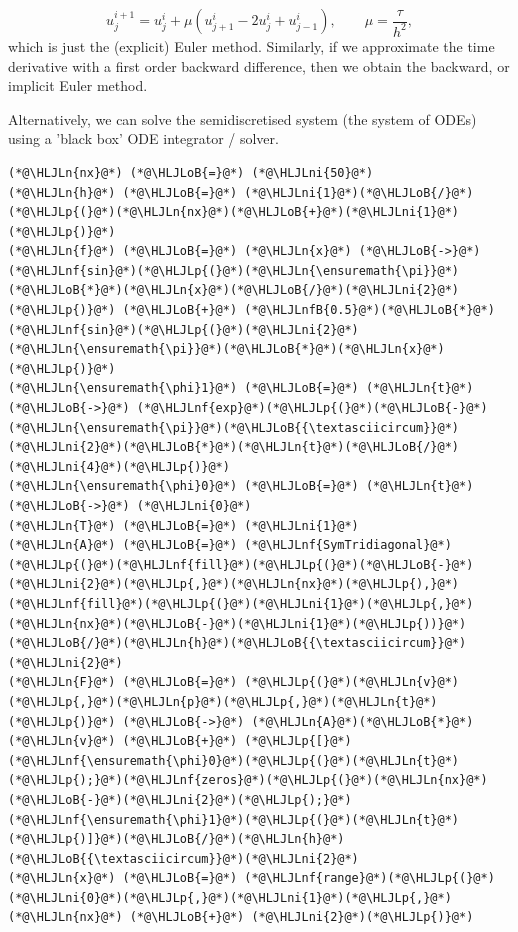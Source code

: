 \documentclass[12pt,a4paper]{article}
\newcommand{\HLJLn}[1]{#1}
\newcommand{\HLJLnf}[1]{\textcolor[RGB]{66,102,213}{#1}}
\newcommand{\HLJLnfB}[1]{\textcolor[RGB]{59,151,46}{#1}}
\newcommand{\HLJLni}[1]{\textcolor[RGB]{59,151,46}{#1}}
\newcommand{\HLJLoB}[1]{\textcolor[RGB]{102,102,102}{\textbf{#1}}}
\newcommand{\HLJLp}[1]{#1}
\begin{document}
\[
u^{i+1}_j = u^i_j + \mu\left(u^i_{j+1} - 2u^i_j + u^i_{j-1}   \right), \qquad \mu = \frac{\tau}{h^2},
\]
which is just the (explicit) Euler method.   Similarly, if we approximate the time derivative with a first order backward difference, then we obtain the backward, or implicit Euler method. 

Alternatively, we can solve the semidiscretised system (the system of ODEs) using a 'black box' ODE integrator / solver.


\begin{lstlisting}
(*@\HLJLn{nx}@*) (*@\HLJLoB{=}@*) (*@\HLJLni{50}@*)
(*@\HLJLn{h}@*) (*@\HLJLoB{=}@*) (*@\HLJLni{1}@*)(*@\HLJLoB{/}@*)(*@\HLJLp{(}@*)(*@\HLJLn{nx}@*)(*@\HLJLoB{+}@*)(*@\HLJLni{1}@*)(*@\HLJLp{)}@*)
(*@\HLJLn{f}@*) (*@\HLJLoB{=}@*) (*@\HLJLn{x}@*) (*@\HLJLoB{->}@*) (*@\HLJLnf{sin}@*)(*@\HLJLp{(}@*)(*@\HLJLn{\ensuremath{\pi}}@*)(*@\HLJLoB{*}@*)(*@\HLJLn{x}@*)(*@\HLJLoB{/}@*)(*@\HLJLni{2}@*)(*@\HLJLp{)}@*) (*@\HLJLoB{+}@*) (*@\HLJLnfB{0.5}@*)(*@\HLJLoB{*}@*)(*@\HLJLnf{sin}@*)(*@\HLJLp{(}@*)(*@\HLJLni{2}@*)(*@\HLJLn{\ensuremath{\pi}}@*)(*@\HLJLoB{*}@*)(*@\HLJLn{x}@*)(*@\HLJLp{)}@*)
(*@\HLJLn{\ensuremath{\phi}1}@*) (*@\HLJLoB{=}@*) (*@\HLJLn{t}@*) (*@\HLJLoB{->}@*) (*@\HLJLnf{exp}@*)(*@\HLJLp{(}@*)(*@\HLJLoB{-}@*)(*@\HLJLn{\ensuremath{\pi}}@*)(*@\HLJLoB{{\textasciicircum}}@*)(*@\HLJLni{2}@*)(*@\HLJLoB{*}@*)(*@\HLJLn{t}@*)(*@\HLJLoB{/}@*)(*@\HLJLni{4}@*)(*@\HLJLp{)}@*)
(*@\HLJLn{\ensuremath{\phi}0}@*) (*@\HLJLoB{=}@*) (*@\HLJLn{t}@*) (*@\HLJLoB{->}@*) (*@\HLJLni{0}@*)
(*@\HLJLn{T}@*) (*@\HLJLoB{=}@*) (*@\HLJLni{1}@*)
(*@\HLJLn{A}@*) (*@\HLJLoB{=}@*) (*@\HLJLnf{SymTridiagonal}@*)(*@\HLJLp{(}@*)(*@\HLJLnf{fill}@*)(*@\HLJLp{(}@*)(*@\HLJLoB{-}@*)(*@\HLJLni{2}@*)(*@\HLJLp{,}@*)(*@\HLJLn{nx}@*)(*@\HLJLp{),}@*)(*@\HLJLnf{fill}@*)(*@\HLJLp{(}@*)(*@\HLJLni{1}@*)(*@\HLJLp{,}@*)(*@\HLJLn{nx}@*)(*@\HLJLoB{-}@*)(*@\HLJLni{1}@*)(*@\HLJLp{))}@*)(*@\HLJLoB{/}@*)(*@\HLJLn{h}@*)(*@\HLJLoB{{\textasciicircum}}@*)(*@\HLJLni{2}@*)
(*@\HLJLn{F}@*) (*@\HLJLoB{=}@*) (*@\HLJLp{(}@*)(*@\HLJLn{v}@*)(*@\HLJLp{,}@*)(*@\HLJLn{p}@*)(*@\HLJLp{,}@*)(*@\HLJLn{t}@*)(*@\HLJLp{)}@*) (*@\HLJLoB{->}@*) (*@\HLJLn{A}@*)(*@\HLJLoB{*}@*)(*@\HLJLn{v}@*) (*@\HLJLoB{+}@*) (*@\HLJLp{[}@*)(*@\HLJLnf{\ensuremath{\phi}0}@*)(*@\HLJLp{(}@*)(*@\HLJLn{t}@*)(*@\HLJLp{);}@*)(*@\HLJLnf{zeros}@*)(*@\HLJLp{(}@*)(*@\HLJLn{nx}@*)(*@\HLJLoB{-}@*)(*@\HLJLni{2}@*)(*@\HLJLp{);}@*)(*@\HLJLnf{\ensuremath{\phi}1}@*)(*@\HLJLp{(}@*)(*@\HLJLn{t}@*)(*@\HLJLp{)]}@*)(*@\HLJLoB{/}@*)(*@\HLJLn{h}@*)(*@\HLJLoB{{\textasciicircum}}@*)(*@\HLJLni{2}@*)
(*@\HLJLn{x}@*) (*@\HLJLoB{=}@*) (*@\HLJLnf{range}@*)(*@\HLJLp{(}@*)(*@\HLJLni{0}@*)(*@\HLJLp{,}@*)(*@\HLJLni{1}@*)(*@\HLJLp{,}@*)(*@\HLJLn{nx}@*) (*@\HLJLoB{+}@*) (*@\HLJLni{2}@*)(*@\HLJLp{)}@*)

\end{lstlisting}
\end{document}
